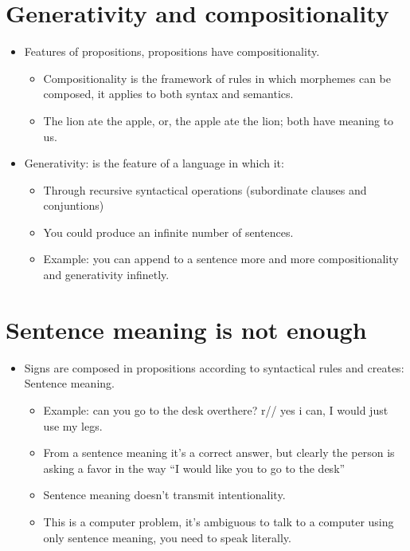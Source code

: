 \section{Generativity and compositionality}
\begin{itemize}
    \item Features of propositions, propositions have compositionality.
        \begin{itemize}
            \item Compositionality is the framework of rules in which morphemes can be composed, it applies to both syntax and semantics.
            \item The lion ate the apple, or, the apple ate the lion; both have meaning to us.
        \end{itemize}
    
    \item Generativity: is the feature of a language in which it:
        \begin{itemize}
            \item Through recursive syntactical operations (subordinate clauses and conjuntions)
            \item You could produce an infinite number of sentences.
            \item Example: you can append to a sentence more and more compositionality and generativity infinetly.
        \end{itemize}
\end{itemize}

\section{Sentence meaning is not enough}
\begin{itemize}
    \item Signs are composed in propositions according to syntactical rules and creates: Sentence meaning.
        \begin{itemize}
            \item Example: can you go to the desk overthere? r// yes i can, I would just use my legs. 
            \item From a sentence meaning it's a correct answer, but clearly the person is asking a favor in the way ``I would like you to go to the desk''
            \item Sentence meaning doesn't transmit intentionality.
            \item This is a computer problem, it's ambiguous to talk to a computer using only sentence meaning, you need to speak literally.
        \end{itemize}
\end{itemize}



